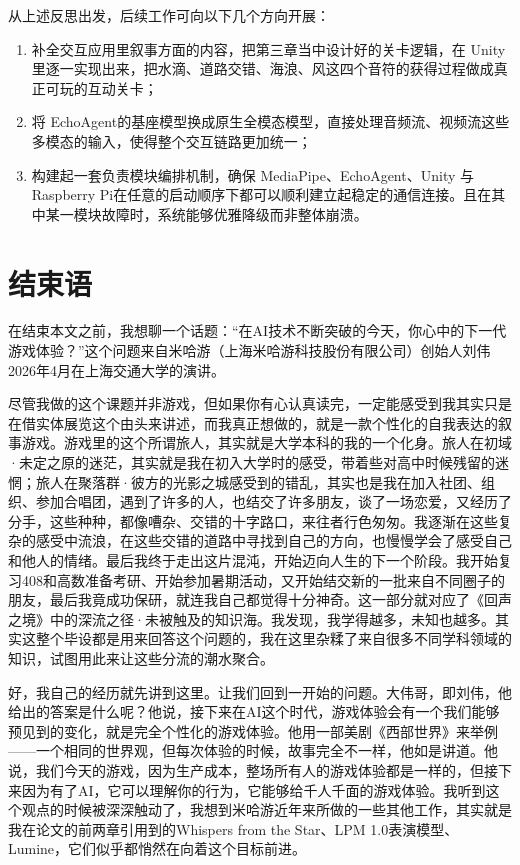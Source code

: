 \documentclass[bachelor]{njupthesis}
\begin{document}
从上述反思出发，后续工作可向以下几个方向开展：

\begin{enumerate}
\item 补全交互应用里叙事方面的内容，把第三章当中设计好的关卡逻辑，在 Unity 里逐一实现出来，把水滴、道路交错、海浪、风这四个音符的获得过程做成真正可玩的互动关卡；

\item 将 EchoAgent的基座模型换成原生全模态模型，直接处理音频流、视频流这些多模态的输入，使得整个交互链路更加统一；

\item 构建起一套负责模块编排机制，确保 MediaPipe、EchoAgent、Unity 与 Raspberry Pi在任意的启动顺序下都可以顺利建立起稳定的通信连接。且在其中某一模块故障时，系统能够优雅降级而非整体崩溃。

\end{enumerate}

\chapter*{结束语}
\thispagestyle{fancy}

在结束本文之前，我想聊一个话题：“在AI技术不断突破的今天，你心中的下一代游戏体验？”这个问题来自米哈游（上海米哈游科技股份有限公司）创始人刘伟2026年4月在上海交通大学的演讲。

尽管我做的这个课题并非游戏，但如果你有心认真读完，一定能感受到我其实只是在借实体展览这个由头来讲述，而我真正想做的，就是一款个性化的自我表达的叙事游戏。游戏里的这个所谓旅人，其实就是大学本科的我的一个化身。旅人在初域·未定之原的迷茫，其实就是我在初入大学时的感受，带着些对高中时候残留的迷惘；旅人在聚落群·彼方的光影之城感受到的错乱，其实也是我在加入社团、组织、参加合唱团，遇到了许多的人，也结交了许多朋友，谈了一场恋爱，又经历了分手，这些种种，都像嘈杂、交错的十字路口，来往者行色匆匆。我逐渐在这些复杂的感受中流浪，在这些交错的道路中寻找到自己的方向，也慢慢学会了感受自己和他人的情绪。最后我终于走出这片混沌，开始迈向人生的下一个阶段。我开始复习408和高数准备考研、开始参加暑期活动，又开始结交新的一批来自不同圈子的朋友，最后我竟成功保研，就连我自己都觉得十分神奇。这一部分就对应了《回声之境》中的深流之径·未被触及的知识海。我发现，我学得越多，未知也越多。其实这整个毕设都是用来回答这个问题的，我在这里杂糅了来自很多不同学科领域的知识，试图用此来让这些分流的潮水聚合。

好，我自己的经历就先讲到这里。让我们回到一开始的问题。大伟哥，即刘伟，他给出的答案是什么呢？他说，接下来在AI这个时代，游戏体验会有一个我们能够预见到的变化，就是完全个性化的游戏体验。他用一部美剧《西部世界》来举例——一个相同的世界观，但每次体验的时候，故事完全不一样，他如是讲道。他说，我们今天的游戏，因为生产成本，整场所有人的游戏体验都是一样的，但接下来因为有了AI，它可以理解你的行为，它能够给千人千面的游戏体验。我听到这个观点的时候被深深触动了，我想到米哈游近年来所做的一些其他工作，其实就是我在论文的前两章引用到的Whispers from the Star、LPM 1.0表演模型、Lumine，它们似乎都悄然在向着这个目标前进。
\end{document}
